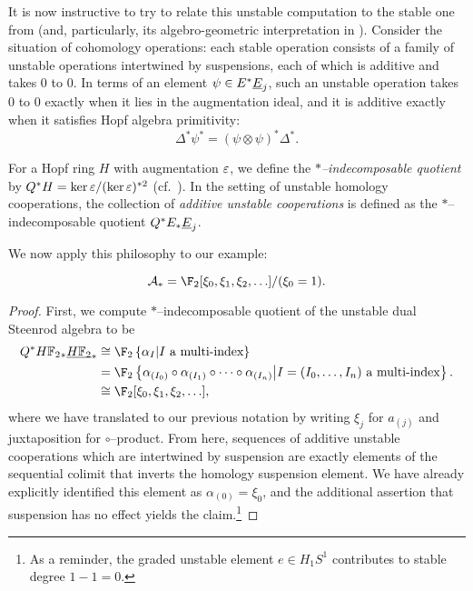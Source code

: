It is now instructive to try to relate this unstable computation to the stable one from  (and, particularly, its algebro-geometric interpretation in ).  Consider the situation of cohomology operations: each stable operation consists of a family of unstable operations intertwined by suspensions, each of which is additive and takes \(0\) to \(0\).  In terms of an element \(\psi \in E^* \underline{\smash{E}}_{j}\), such an unstable operation takes \(0\) to \(0\) exactly when it lies in the augmentation ideal, and it is additive exactly when it satisfies Hopf algebra primitivity: \[\Delta^* \psi^* = (\psi \otimes \psi)^* \Delta^*.\]
\begin{definition}
For a Hopf ring \(H\) with augmentation \(\varepsilon\), we define the \textit{\(\ast\)--indecomposable quotient} by \(Q^* H = \ker \varepsilon / (\ker \varepsilon)^{\ast 2}\) (cf.\ ).  In the setting of unstable homology cooperations, the collection of \textit{additive unstable cooperations} is defined as the \(\ast\)--indecomposable quotient \(Q^* E_* \underline{\smash{E}}_{j}\).
\end{definition}

We now apply this philosophy to our example:
\begin{corollary}\label{StarIndecompsInUDualSteenrodAlg}
\[\mathcal A_* = \F_2[\xi_0, \xi_1, \xi_2, \ldots]/(\xi_0 = 1).\]
\end{corollary}
\begin{proof}
First, we compute \(\ast\)--indecomposable quotient of the unstable dual Steenrod algebra to be
\begin{align*}
Q^\ast \HFtwo_* \OS{\HFtwo}{*} & \cong \F_2\left\{\alpha_{I} \middle| \text{\(I\) a multi-index}\right\} \\
& = \F_2\left\{ \alpha_{(I_0)} \circ \alpha_{(I_1)} \circ \cdots \circ \alpha_{(I_n)} \middle| \text{\(I = (I_0, \ldots, I_n)\) a multi-index}\right\}. \\
& \cong \F_2[\xi_0, \xi_1, \xi_2, \ldots],
\end{align*}
where we have translated to our previous notation by writing \(\xi_j\) for \(a_{(j)}\) and juxtaposition for \(\circ\)--product.  From here, sequences of additive unstable cooperations which are intertwined by suspension are exactly elements of the sequential colimit that inverts the homology suspension element.  We have already explicitly identified this element as \(\alpha_{(0)} = \xi_0\), and the additional assertion that suspension has no effect yields the claim.\footnote{As a reminder, the graded unstable element \(e \in H_1 S^1\) contributes to stable degree \(1 - 1 = 0\).}
\end{proof}


